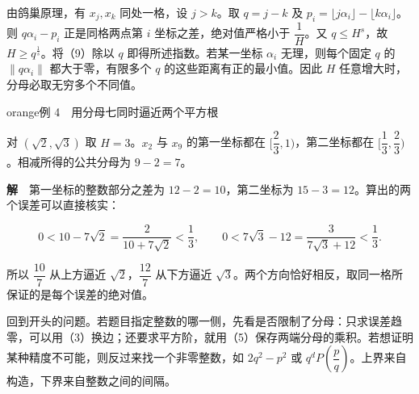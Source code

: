 \documentclass[11pt,a4paper]{article}
\begin{document}
由鸽巢原理，有 $x_j,x_k$ 同处一格，设 $j>k$。取 $q=j-k$ 及 $p_i=\lfloor j\alpha_i\rfloor-\lfloor k\alpha_i\rfloor$。则 $q\alpha_i-p_i$ 正是同格两点第 $i$ 坐标之差，绝对值严格小于 $\dfrac1H$。又 $q\le H^s$，故 $H\ge q^{\frac1s}$。将（9）除以 $q$ 即得所述指数。若某一坐标 $\alpha_i$ 无理，则每个固定 $q$ 的 $\|q\alpha_i\|$ 都大于零，有限多个 $q$ 的这些距离有正的最小值。因此 $H$ 任意增大时，分母必取无穷多个不同值。

\begin{sboxenv}{orange}{例 4　用分母七同时逼近两个平方根}

对 $(\sqrt2,\sqrt3)$ 取 $H=3$。$x_2$ 与 $x_9$ 的第一坐标都在 $[\dfrac23,1)$，第二坐标都在 $[\dfrac13,\dfrac23)$。相减所得的公共分母为 $9-2=7$。
\end{sboxenv}

\textbf{解}　第一坐标的整数部分之差为 $12-2=10$，第二坐标为 $15-3=12$。算出的两个误差可以直接核实：

\[
0<10-7\sqrt2=\frac2{10+7\sqrt2}<\frac13,\qquad
0<7\sqrt3-12=\frac3{7\sqrt3+12}<\frac13.
\]

所以 $\dfrac{10}{7}$ 从上方逼近 $\sqrt2$，$\dfrac{12}{7}$ 从下方逼近 $\sqrt3$。两个方向恰好相反，取同一格所保证的是每个误差的绝对值。

回到开头的问题。若题目指定整数的哪一侧，先看是否限制了分母：只求误差趋零，可以用（3）换边；还要求平方阶，就用（5）保存两端分母的乘积。若想证明某种精度不可能，则反过来找一个非零整数，如 $2q^2-p^2$ 或 $q^dP(\dfrac pq)$。上界来自构造，下界来自整数之间的间隔。
\end{document}
